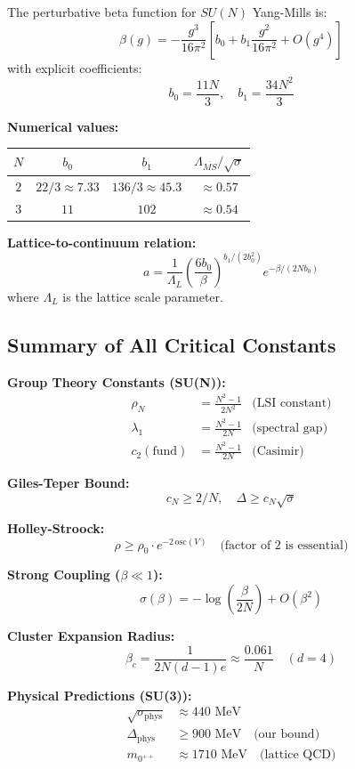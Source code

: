 \begin{theorem}
\label{thm:beta-function-v2-app81}
The perturbative beta function for $SU(N)$ Yang-Mills is:
\[
\beta(g) = -\frac{g^3}{16\pi^2}\left[b_0 + b_1 \frac{g^2}{16\pi^2} + O(g^4)\right]
\]
with explicit coefficients:
\[
b_0 = \frac{11N}{3}, \quad b_1 = \frac{34N^2}{3}
\]

\textbf{Numerical values:}
\begin{center}
\begin{tabular}{|c|c|c|c|}
\hline
$N$ & $b_0$ & $b_1$ & $\Lambda_{\overline{MS}}/\sqrt{\sigma}$ \\
\hline
$2$ & $22/3 \approx 7.33$ & $136/3 \approx 45.3$ & $\approx 0.57$ \\
\hline
$3$ & $11$ & $102$ & $\approx 0.54$ \\
\hline
\end{tabular}
\end{center}

\textbf{Lattice-to-continuum relation:}
\[
a = \frac{1}{\Lambda_L}\left(\frac{6b_0}{\beta}\right)^{b_1/(2b_0^2)} 
e^{-\beta/(2Nb_0)}
\]
where $\Lambda_L$ is the lattice scale parameter.
\end{theorem}

\subsection{Summary of All Critical Constants}

\begin{tcolorbox}[colback=blue!5!white,colframe=blue!75!black,title=\textbf{Complete Constant Summary}]

\textbf{Group Theory Constants (SU(N)):}
\begin{align*}
\rho_N &= \frac{N^2-1}{2N^2} & \text{(LSI constant)} \\
\lambda_1 &= \frac{N^2-1}{2N} & \text{(spectral gap)} \\
c_2(\text{fund}) &= \frac{N^2-1}{2N} & \text{(Casimir)}
\end{align*}

\textbf{Giles-Teper Bound:}
\[
c_N \geq 2/N , \quad \Delta \geq c_N\sqrt{\sigma}
\]

\textbf{Holley-Stroock:}
\[
\rho \geq \rho_0 \cdot e^{-2\,\mathrm{osc}(V)} \quad \text{(factor of 2 is essential)}
\]

\textbf{Strong Coupling ($\beta \ll 1$):}
\[
\sigma(\beta) = -\log\left(\frac{\beta}{2N}\right) + O(\beta^2)
\]

\textbf{Cluster Expansion Radius:}
\[
\beta_c = \frac{1}{2N(d-1)e} \approx \frac{0.061}{N} \quad (d=4)
\]

\textbf{Physical Predictions (SU(3)):}
\begin{align*}
\sqrt{\sigma_{\text{phys}}} &\approx 440 \text{ MeV} \\
\Delta_{\text{phys}} &\geq 900 \text{ MeV} \quad \text{(our bound)} \\
m_{0^{++}} &\approx 1710 \text{ MeV} \quad \text{(lattice QCD)}
\end{align*}

\end{tcolorbox}

